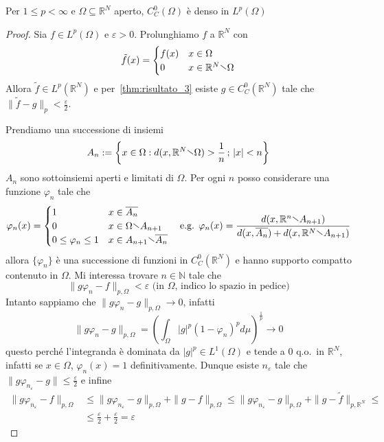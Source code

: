 \begin{theorem}[\(\overline{C_C^0(\Omega)} = L^p(\Omega)\) ]\label{thm:risultato_4}
    Per \(1 \le p < \infty\) e \(\Omega \subseteq \mathbb{R}^{N} \) aperto, 
    \(C_C^{0}{(\Omega)}\) è denso in \(L^p{(\Omega)}\)
\end{theorem}
\begin{proof}
    Sia \(f \in L^p(\Omega)\) e \(\varepsilon>0\). Prolunghiamo \(f\) a
    \(\mathbb{R}^{N}\) con 
    \[
        \tilde{f}{(x)} = \begin{cases}
            f{(x)} & x \in \Omega \\
            0 & x \in \mathbb{R}^{N} \sminus \Omega
        \end{cases}
    \]
    Allora \(\tilde{f} \in L^p(\mathbb{R}^{N})\) e per~\ref{thm:risultato_3}
    esiste \(g \in C_C^{0}{(\mathbb{R}^{N})}\) tale che \(\|\tilde{f} - g\|_p <
    \frac{\varepsilon}{2}\).

    Prendiamo una successione di insiemi 
    \[
        A_{n} := \left\{x \in \Omega: d{(x, \mathbb{R}^{N} \sminus \Omega)} >
        \frac{1}{n} \, ; \, |x| < n\right\} 
    \]
    \(A_{n}\) sono sottoinsiemi aperti e limitati di \(\Omega\). Per ogni \(n\)
    posso considerare una funzione \(\varphi_n\) tale che
    \[
        \varphi_n{(x)} = \begin{cases}
            1 & x \in \overline{A_{n}} \\
            0 & x \in \Omega \sminus A_{n+1} \\
            0 \le \varphi_n \le 1 & x \in A_{n+1} \sminus \overline{A_{n}}
        \end{cases}
        \quad \text{e.g. }
        \varphi_n{(x)} = \frac{d(x, \mathbb{R}^{n} \sminus A_{n+1})}{d{(x,
        \overline{A_{n}}) + d{(x, \mathbb{R}^{N} \sminus A_{n+1})}}}
    \]
    allora \(\{\varphi _n\} \) è una successione di funzioni in
    \(C_C^{0}{(\mathbb{R}^{N})}\) e hanno supporto compatto contenuto in
    \(\Omega\). Mi interessa trovare \(n \in \mathbb{N}\) tale che
    \[
        \|g \varphi_n - f\|_{p, \Omega}  < \varepsilon \text{ (in \(\Omega\),
        indico lo spazio in pedice)}
    \]
    Intanto sappiamo che \(\|g \varphi _n - g\|_{p, \Omega} \to 0\), infatti
    \[
        \|g \varphi _n - g \|_{p, \Omega}  = {\left( \int_{\Omega} |g|^{p} {(1 -
    \varphi _n)}^{p} d\mu \right)}^{\frac{1}{p}} \to 0
    \]
    questo perché l'integranda è dominata da \(|g|^{p} \in L^1(\Omega)\)
    e tende a 0 q.o.~in \(\mathbb{R}^{N}\), infatti se \(x \in \Omega\),
    \(\varphi_n{(x)} = 1\) definitivamente. Dunque esiste \(n_\varepsilon\) tale
    che \(\|g \varphi_{n_\varepsilon} - g\| \le \frac{\varepsilon}{2}\) 
    e infine
    \begin{align*}
        \|g \varphi_{n_\varepsilon}  - f\|_{p, \Omega}  &\le   \|g \varphi
        _{n_\varepsilon}  - g\|_{p, \Omega}
        + \|g - f\|_{p, \Omega} \le \|g \varphi_{n_\varepsilon}  - g\|_{p, \Omega} + \|g -
        \tilde{f}\|_{p, \mathbb{R}^{N}} \le \\
        &\le \frac{\varepsilon}{2} + \frac{\varepsilon}{2} = \varepsilon
    \end{align*}
\end{proof}

